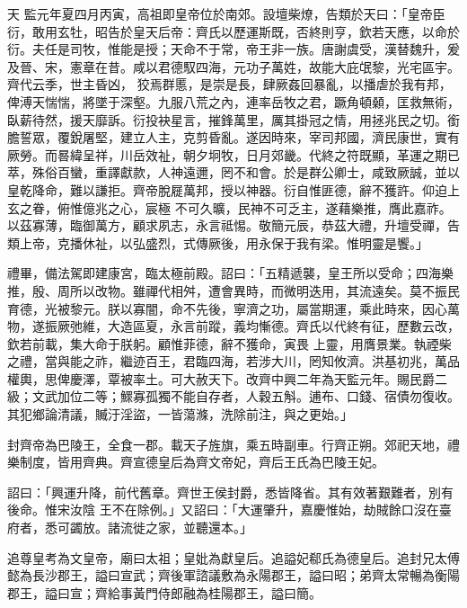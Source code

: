
\begin{pinyinscope}

 天
 監元年夏四月丙寅，高祖即皇帝位於南郊。設壇柴燎，告類於天曰：「皇帝臣衍，敢用玄牡，昭告於皇天后帝：齊氏以歷運斯既，否終則亨，欽若天應，以命於衍。夫任是司牧，惟能是授；天命不于常，帝王非一族。唐謝虞受，漢替魏升，爰及晉、宋，憲章在昔。咸以君德馭四海，元功子萬姓，故能大庇氓黎，光宅區宇。齊代云季，世主昏凶，
 狡焉群慝，是崇是長，肆厥姦回暴亂，以播虐於我有邦，俾溥天惴惴，將墜于深壑。九服八荒之內，連率岳牧之君，蹶角頓顙，匡救無術，臥薪待然，援天靡訴。衍投袂星言，摧鋒萬里，厲其掛冠之情，用拯兆民之切。銜膽誓眾，覆銳屠堅，建立人主，克剪昏亂。遂因時來，宰司邦國，濟民康世，實有厥勞。而晷緯呈祥，川岳效祉，朝夕坰牧，日月郊畿。代終之符既顯，革運之期已萃，殊俗百蠻，重譯獻款，人神遠邇，罔不和會。於是群公卿士，咸致厥誠，並以皇乾降命，難以謙拒。齊帝脫屣萬邦，授以神器。衍自惟匪德，辭不獲許。仰迫上玄之眷，俯惟億兆之心，宸極
 不可久曠，民神不可乏主，遂藉樂推，膺此嘉祚。以茲寡薄，臨御萬方，顧求夙志，永言祗惕。敬簡元辰，恭茲大禮，升壇受禪，告類上帝，克播休祉，以弘盛烈，式傳厥後，用永保于我有梁。惟明靈是饗。」



 禮畢，備法駕即建康宮，臨太極前殿。詔曰：「五精遞襲，皇王所以受命；四海樂推，殷、周所以改物。雖禪代相舛，遭會異時，而微明迭用，其流遠矣。莫不振民育德，光被黎元。朕以寡闇，命不先後，寧濟之功，屬當期運，乘此時來，因心萬物，遂振厥弛維，大造區夏，永言前蹤，義均慚德。齊氏以代終有征，歷數云改，欽若前載，集大命于朕躬。顧惟菲德，辭不獲命，寅畏
 上靈，用膺景業。執禋柴之禮，當與能之祚，繼迹百王，君臨四海，若涉大川，罔知攸濟。洪基初兆，萬品權輿，思俾慶澤，覃被率土。可大赦天下。改齊中興二年為天監元年。賜民爵二級；文武加位二等；鰥寡孤獨不能自存者，人穀五斛。逋布、口錢、宿債勿復收。其犯鄉論清議，贓汙淫盜，一皆蕩滌，洗除前注，與之更始。」



 封齊帝為巴陵王，全食一郡。載天子旌旗，乘五時副車。行齊正朔。郊祀天地，禮樂制度，皆用齊典。齊宣德皇后為齊文帝妃，齊后王氏為巴陵王妃。



 詔曰：「興運升降，前代舊章。齊世王侯封爵，悉皆降省。其有效著艱難者，別有後命。惟宋汝陰
 王不在除例。」又詔曰：「大運肇升，嘉慶惟始，劫賊餘口沒在臺府者，悉可蠲放。諸流徙之家，並聽還本。」



 追尊皇考為文皇帝，廟曰太祖；皇妣為獻皇后。追謚妃郗氏為德皇后。追封兄太傅懿為長沙郡王，謚曰宣武；齊後軍諮議敷為永陽郡王，謚曰昭；弟齊太常暢為衡陽郡王，謚曰宣；齊給事黃門侍郎融為桂陽郡王，謚曰簡。




\end{pinyinscope}
